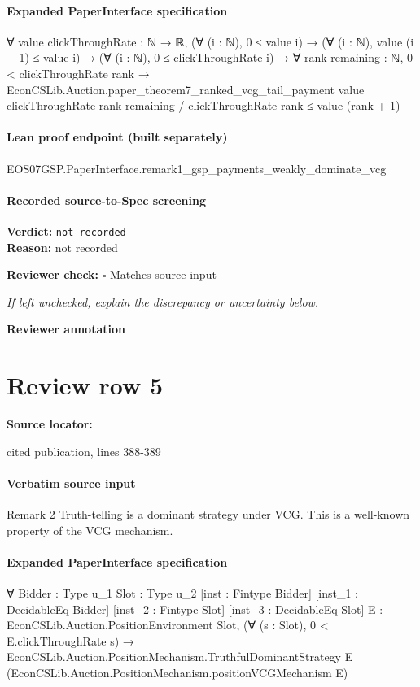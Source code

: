 \documentclass[10pt]{article}
\newcommand{\reviewerbox}{%
  \par\noindent\fbox{\parbox{0.96\linewidth}{\rule{0pt}{0.38in}}}\par
}
\newcommand{\reviewmatch}[1]{%
  \par\noindent\textbf{Reviewer check:} $\square$\; #1\par
  \noindent\emph{If left unchecked, explain the discrepancy or uncertainty below.}\par
}
\begin{document}
\paragraph{Expanded PaperInterface specification}
\begin{ReviewVerbatim}
∀ {value clickThroughRate : ℕ → ℝ},
  (∀ (i : ℕ), 0 ≤ value i) →
    (∀ (i : ℕ), value (i + 1) ≤ value i) →
      (∀ (i : ℕ), 0 ≤ clickThroughRate i) →
        ∀ {rank remaining : ℕ},
          0 < clickThroughRate rank →
            EconCSLib.Auction.paper_theorem7_ranked_vcg_tail_payment value clickThroughRate rank remaining /
                clickThroughRate rank ≤
              value (rank + 1)
\end{ReviewVerbatim}

\paragraph{Lean proof endpoint (built separately)}\begin{ReviewVerbatim}
EOS07GSP.PaperInterface.remark1_gsp_payments_weakly_dominate_vcg
\end{ReviewVerbatim}

\paragraph{Recorded source-to-Spec screening}
\textbf{Verdict:} \texttt{not recorded}
\\
\textbf{Reason:} not recorded
\reviewmatch{Matches source input}
\noindent\textbf{Reviewer annotation}\par
\reviewerbox
\clearpage
\hypertarget{source-claim-912ce3e72e5aabde}{}
\section*{Review row 5}
\textbf{Source locator:} {\footnotesize\raggedright cited publication, lines 388-\allowbreak{}389\par}
\paragraph{Verbatim source input}
\begin{ReviewVerbatim}
Remark 2 Truth-telling is a dominant strategy under VCG.
This is a well-known property of the VCG mechanism.
\end{ReviewVerbatim}


\paragraph{Expanded PaperInterface specification}
\begin{ReviewVerbatim}
∀ {Bidder : Type u_1} {Slot : Type u_2} [inst : Fintype Bidder] [inst_1 : DecidableEq Bidder] [inst_2 : Fintype Slot]
  [inst_3 : DecidableEq Slot] {E : EconCSLib.Auction.PositionEnvironment Slot},
  (∀ (s : Slot), 0 < E.clickThroughRate s) →
    EconCSLib.Auction.PositionMechanism.TruthfulDominantStrategy E
      (EconCSLib.Auction.PositionMechanism.positionVCGMechanism E)
\end{ReviewVerbatim}
\end{document}

